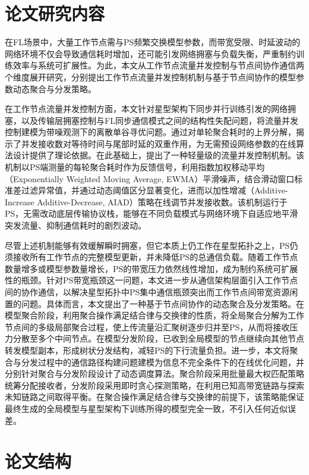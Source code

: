 \documentclass[master, vlined]{DissertUESTC}
\begin{document}
	\section{论文研究内容}

	在FL场景中，大量工作节点需与PS频繁交换模型参数，而带宽受限、时延波动的网络环境不仅会导致通信耗时增加，还可能引发网络拥塞与负载失衡，严重制约训练效率与系统可扩展性。为此，本文从工作节点流量并发控制与节点间协作通信两个维度展开研究，分别提出工作节点流量并发控制机制与基于节点间协作的模型参数动态聚合与分发策略。

	在工作节点流量并发控制方面，本文针对星型架构下同步并行训练引发的网络拥塞，以及传输层拥塞控制与FL同步通信模式之间的结构性失配问题，将流量并发控制建模为带噪观测下的离散单谷寻优问题。通过对单轮聚合耗时的上界分解，揭示了并发接收数对等待时间与尾部时延的双重作用，为无需预设网络参数的在线算法设计提供了理论依据。在此基础上，提出了一种轻量级的流量并发控制机制。该机制以PS端测量的每轮聚合耗时作为反馈信号，利用指数加权移动平均（Exponentially Weighted Moving Average, EWMA）平滑噪声，结合滑动窗口标准差过滤异常值，并通过动态阈值区分显著变化，进而以加性增减（Additive-Increase Additive-Decrease, AIAD）策略在线调节并发接收数。该机制运行于PS，无需改动底层传输协议栈，能够在不同负载模式与网络环境下自适应地平滑突发流量、抑制通信耗时的剧烈波动。

	尽管上述机制能够有效缓解瞬时拥塞，但它本质上仍工作在星型拓扑之上，PS仍须接收所有工作节点的完整模型更新，并未降低PS的总通信负载。随着工作节点数量增多或模型参数量增长，PS的带宽压力依然线性增加，成为制约系统可扩展性的瓶颈。针对PS带宽瓶颈这一问题，本文进一步从通信架构层面引入工作节点间的协作通信，以解决星型拓扑中PS集中通信瓶颈突出而工作节点间带宽资源闲置的问题。具体而言，本文提出了一种基于节点间协作的动态聚合及分发策略。在模型聚合阶段，利用聚合操作满足结合律与交换律的性质，将全局聚合分解为工作节点间的多级局部聚合过程，使上传流量沿汇聚树逐步归并至PS，从而将接收压力分散至多个中间节点。在模型分发阶段，已收到全局模型的节点继续向其他节点转发模型副本，形成树状分发结构，减轻PS的下行流量负担。进一步，本文将聚合与分发过程中的通信路径构建问题建模为信息不完全条件下的在线优化问题，并分别针对聚合与分发阶段设计了动态调度算法。聚合阶段采用批量最大权匹配策略统筹分配接收者，分发阶段采用即时贪心探测策略，在利用已知高带宽链路与探索未知链路之间取得平衡。在聚合操作满足结合律与交换律的前提下，该策略能保证最终生成的全局模型与星型架构下训练所得的模型完全一致，不引入任何近似误差。

	\section{论文结构}
\end{document}
